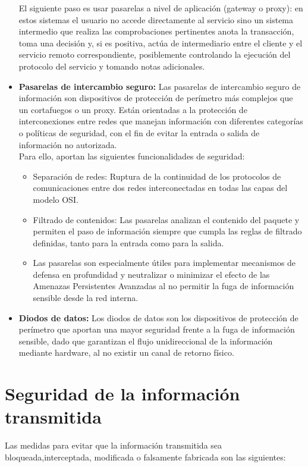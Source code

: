 \documentclass[11pt,bibtotoc,noliststotoc,BCOR0mm]{scrbook}
\begin{document}
\begin{itemize}
El siguiente paso es usar pasarelas a nivel de aplicación (gateway o proxy): en estos sistemas el usuario no accede directamente al servicio sino un sistema intermedio que realiza las comprobaciones pertinentes anota la transacción, toma una decisión y, si es positiva, actúa de intermediario entre el cliente y el servicio remoto correspondiente, posiblemente controlando la ejecución del protocolo del servicio y tomando notas adicionales.
\item \textbf{Pasarelas de intercambio seguro:} Las pasarelas de intercambio seguro de información son dispositivos de protección de perímetro más complejos que un cortafuegos o un proxy. Están orientadas a la protección de interconexiones entre redes que manejan información con diferentes categorías o políticas de seguridad, con el fin de evitar la entrada o salida de información no autorizada.\\
Para ello, aportan las siguientes funcionalidades de seguridad:\\
\begin{itemize}
\item Separación de redes: Ruptura de la continuidad de los protocolos de comunicaciones entre dos redes interconectadas en todas las capas del modelo OSI.
\item Filtrado de contenidos: Las pasarelas analizan el contenido del paquete y permiten el paso de información siempre que cumpla las reglas de filtrado definidas, tanto para la entrada como para la salida.
\item Las pasarelas son especialmente útiles para implementar mecanismos de defensa en profundidad y neutralizar o minimizar el efecto de las Amenazas Persistentes Avanzadas al no permitir la fuga de información sensible desde la red interna.
\end{itemize}
\item \textbf{Diodos de datos:} Los diodos de datos son los dispositivos de protección de perímetro que aportan una mayor seguridad frente a la fuga de información sensible, dado que garantizan el flujo unidireccional de la información mediante hardware, al no existir un canal de retorno físico. 
\end{itemize}

\section{Seguridad de la información transmitida}

Las medidas para evitar que la información transmitida sea bloqueada,interceptada, modificada o falsamente fabricada son las siguientes:
\end{document}
